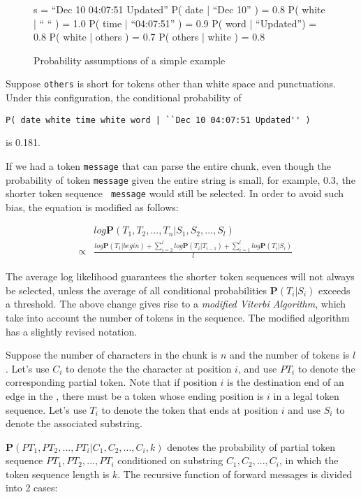 \begin{figure}[t]
\begin{centercode}
s  = ``Dec 10 04:07:51 Updated''
P( date | ``Dec 10'' ) = 0.8
P( white | `` `` ) = 1.0
P( time | ``04:07:51'' ) = 0.9
P( word | ``Updated'') = 0.8
P( white | others ) = 0.7
P( others | white ) = 0.8
\end{centercode}
\caption{Probability assumptions of a simple example}
\end{figure}

Suppose {\tt others} is short for tokens other than white space and
punctuations. Under this configuration, the conditional probability
of
\begin{verbatim}
P( date white time white word | ``Dec 10 04:07:51 Updated'' ) 
\end{verbatim}
is 0.181.

If we had a token {\tt message} that can parse the entire chunk,
even though the probability of token {\tt message} given the entire
string is small, for example, 0.3, the shorter token sequence {\tt
message} would still be selected. In order to avoid such bias, the
equation is modified as follows:

\begin{eqnarray*}
&& log \mathbf{P}(T_1, T_2, ..., T_n|S_1, S_2, ..., S_l) \\ 
& \propto & \frac{log \mathbf{P}(T_1|begin) +
\sum_{i=2}^{l}log \mathbf{P}(T_i|T_{i-1}) + \sum_{i=1}^{l}log
\mathbf{P}(T_i|S_i)}{l}
\end{eqnarray*}

The average log likelihood guarantees the shorter token sequences
will not always be selected, unless the average of all conditional
probabilities $\mathbf{P}(T_i|S_i)$ exceeds a threshold.
The above change gives rise to a {\em modified Viterbi Algorithm},
which take into account the number of tokens in the sequence.
The modified algorithm has a slightly revised notation. 

Suppose the number of characters
in the chunk is $n$ and the number of tokens is $l$. Let's use $C_i$
to denote the the character at
position $i$, and use $PT_i$ to denote the corresponding partial
token. Note that if position $i$ is the destination end of an edge in
the \seqset{}, there must be a token whose ending position is
$i$ in a legal token sequence. Let's use $T_i$ to denote the token
that ends at position $i$ and
use $S_i$ to denote the associated substring. 

$\mathbf{P}(PT_1, PT_2, ..., PT_i|C_1, C_2, ..., C_i, k)$ denotes the
probability of partial token sequence $PT_1, PT_2, ..., PT_i$
conditioned on substring $C_1, C_2, ..., C_i$, in which the token
sequence length is $k$. The recursive function of forward messages is
divided into 2 cases:

